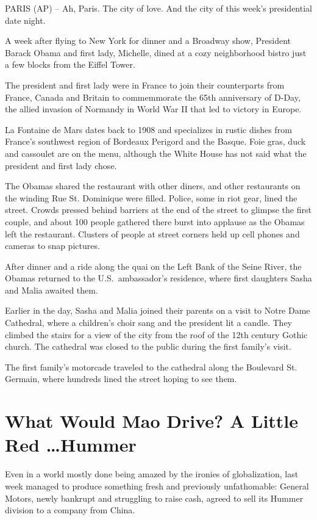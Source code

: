 \documentclass[12pt,a4paper,onecolumn]{article}
\begin{document}
PARIS (AP) -- Ah, Paris. The city of love. And the city of this week's presidential date night.

A week after flying to New York for dinner and a Broadway show, President Barack Obama and first
lady, Michelle, dined at a cozy neighborhood bistro just a few blocks from the Eiffel Tower.

The president and first lady were in France to join their counterparts from France, Canada and
Britain to commemmorate the 65th anniversary of D-Day, the allied invasion of Normandy in World War
II that led to victory in Europe.

La Fontaine de Mars dates back to 1908 and specializes in rustic dishes from France's southwest
region of Bordeaux Perigord and the Basque. Foie gras, duck and cassoulet are on the menu, although
the White House has not said what the president and first lady chose.

The Obamas shared the restaurant with other diners, and other restaurants on the winding Rue St.
Dominique were filled. Police, some in riot gear, lined the street. Crowds pressed behind barriers
at the end of the street to glimpse the first couple, and about 100 people gathered there burst into
applause as the Obamas left the restaurant. Clusters of people at street corners held up cell phones
and cameras to snap pictures.

After dinner and a ride along the quai on the Left Bank of the Seine River, the Obamas returned to
the U.S.~ambassador's residence, where first daughters Sasha and Malia awaited them.

Earlier in the day, Sasha and Malia joined their parents on a visit to Notre Dame Cathedral, where a
children's choir sang and the president lit a candle. They climbed the stairs for a view of the city
from the roof of the 12th century Gothic church. The cathedral was closed to the public during the
first family's visit.

The first family's motorcade traveled to the cathedral along the Boulevard St. Germain, where
hundreds lined the street hoping to see them.

\section{What Would Mao Drive? A Little Red \ldots Hummer}

Even in a world mostly done being amazed by the ironies of globalization, last week managed to
produce something fresh and previously unfathomable: General Motors, newly bankrupt and struggling
to raise cash, agreed to sell its Hummer division to a company from China.
\end{document}
